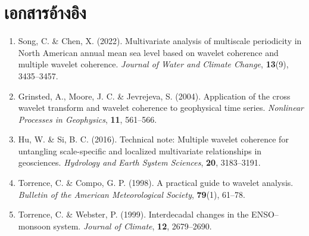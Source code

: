 \documentclass[a4paper,12pt]{article}
\begin{document}
\section*{เอกสารอ้างอิง}
\vspace{-0.3em}
{\small
\begin{enumerate}[leftmargin=1.8em,itemsep=0.15em,parsep=0pt]
  \item Song, C. \& Chen, X. (2022). Multivariate analysis of multiscale periodicity in North
        American annual mean sea level based on wavelet coherence and multiple wavelet coherence.
        \textit{Journal of Water and Climate Change}, \textbf{13}(9), 3435--3457.
  \item Grinsted, A., Moore, J. C. \& Jevrejeva, S. (2004). Application of the cross wavelet
        transform and wavelet coherence to geophysical time series.
        \textit{Nonlinear Processes in Geophysics}, \textbf{11}, 561--566.
  \item Hu, W. \& Si, B. C. (2016). Technical note: Multiple wavelet coherence for untangling
        scale-specific and localized multivariate relationships in geosciences.
        \textit{Hydrology and Earth System Sciences}, \textbf{20}, 3183--3191.
  \item Torrence, C. \& Compo, G. P. (1998). A practical guide to wavelet analysis.
        \textit{Bulletin of the American Meteorological Society}, \textbf{79}(1), 61--78.
  \item Torrence, C. \& Webster, P. (1999). Interdecadal changes in the ENSO--monsoon system.
        \textit{Journal of Climate}, \textbf{12}, 2679--2690.
\end{enumerate}
}
\end{document}
